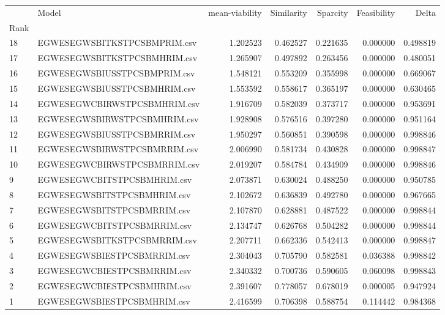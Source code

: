 \begin{tabular}{llrrrrr}
 & Model & mean-viability & Similarity & Sparcity & Feasibility & Delta \\
Rank &  &  &  &  &  &  \\
18 & EGW\-ES\-EGW\-SBI\-TKS\-TPC\-SBM\-PR\-IM.csv & 1.202523 & 0.462527 & 0.221635 & 0.000000 & 0.498819 \\
17 & EGW\-ES\-EGW\-SBI\-TKS\-TPC\-SBM\-HR\-IM.csv & 1.265907 & 0.497892 & 0.263456 & 0.000000 & 0.480051 \\
16 & EGW\-ES\-EGW\-SBI\-USS\-TPC\-SBM\-PR\-IM.csv & 1.548121 & 0.553209 & 0.355998 & 0.000000 & 0.669067 \\
15 & EGW\-ES\-EGW\-SBI\-USS\-TPC\-SBM\-HR\-IM.csv & 1.553592 & 0.558617 & 0.365197 & 0.000000 & 0.630465 \\
14 & EGW\-ES\-EGW\-CBI\-RWS\-TPC\-SBM\-HR\-IM.csv & 1.916709 & 0.582039 & 0.373717 & 0.000000 & 0.953691 \\
13 & EGW\-ES\-EGW\-SBI\-RWS\-TPC\-SBM\-HR\-IM.csv & 1.928908 & 0.576516 & 0.397280 & 0.000000 & 0.951164 \\
12 & EGW\-ES\-EGW\-SBI\-USS\-TPC\-SBM\-RR\-IM.csv & 1.950297 & 0.560851 & 0.390598 & 0.000000 & 0.998846 \\
11 & EGW\-ES\-EGW\-SBI\-RWS\-TPC\-SBM\-RR\-IM.csv & 2.006990 & 0.581734 & 0.430828 & 0.000000 & 0.998847 \\
10 & EGW\-ES\-EGW\-CBI\-RWS\-TPC\-SBM\-RR\-IM.csv & 2.019207 & 0.584784 & 0.434909 & 0.000000 & 0.998846 \\
9 & EGW\-ES\-EGW\-CBI\-TS\-TPC\-SBM\-HR\-IM.csv & 2.073871 & 0.630024 & 0.488250 & 0.000000 & 0.950785 \\
8 & EGW\-ES\-EGW\-SBI\-TS\-TPC\-SBM\-HR\-IM.csv & 2.102672 & 0.636839 & 0.492780 & 0.000000 & 0.967665 \\
7 & EGW\-ES\-EGW\-SBI\-TS\-TPC\-SBM\-RR\-IM.csv & 2.107870 & 0.628881 & 0.487522 & 0.000000 & 0.998844 \\
6 & EGW\-ES\-EGW\-CBI\-TS\-TPC\-SBM\-RR\-IM.csv & 2.134747 & 0.626768 & 0.504282 & 0.000000 & 0.998844 \\
5 & EGW\-ES\-EGW\-SBI\-TKS\-TPC\-SBM\-RR\-IM.csv & 2.207711 & 0.662336 & 0.542413 & 0.000000 & 0.998847 \\
4 & EGW\-ES\-EGW\-SBI\-ES\-TPC\-SBM\-RR\-IM.csv & 2.304043 & 0.705790 & 0.582581 & 0.036388 & 0.998842 \\
3 & EGW\-ES\-EGW\-CBI\-ES\-TPC\-SBM\-RR\-IM.csv & 2.340332 & 0.700736 & 0.590605 & 0.060098 & 0.998843 \\
2 & EGW\-ES\-EGW\-CBI\-ES\-TPC\-SBM\-HR\-IM.csv & 2.391607 & 0.778057 & 0.678019 & 0.000005 & 0.947924 \\
1 & EGW\-ES\-EGW\-SBI\-ES\-TPC\-SBM\-HR\-IM.csv & 2.416599 & 0.706398 & 0.588754 & 0.114442 & 0.984368 \\
\end{tabular}
